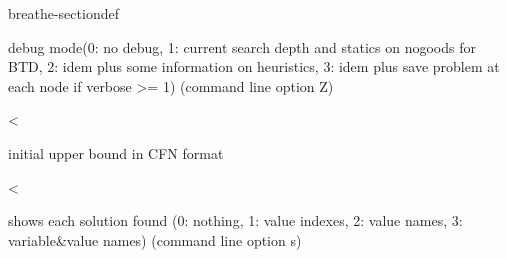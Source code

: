 \documentclass[letterpaper,10pt,openany,oneside,english]{sphinxmanual}
\begin{document}
\begin{fulllineitems}
\begin{sphinxuseclass}{breathe-sectiondef}
\begin{fulllineitems}
\sphinxAtStartPar
debug mode(0: no debug, 1: current search depth and statics on nogoods for BTD, 2: idem plus some information on heuristics, 3: idem plus save problem at each node if verbose \textgreater{}= 1) (command line option \sphinxhyphen{}Z) 

\end{fulllineitems}


\begin{fulllineitems}
\label{\detokenize{ref/ref_cpp:_CPPv4N8ToulBar213showSolutionsE}}\label{\detokenize{ref/ref_cpp:_CPPv3N8ToulBar213showSolutionsE}}\label{\detokenize{ref/ref_cpp:_CPPv2N8ToulBar213showSolutionsE}}\label{\detokenize{ref/ref_cpp:ToulBar2::showSolutions__i}}
\pysigstartsignatures
\pysigstartmultiline
{}
\pysigstopmultiline
\pysigstopsignatures
\sphinxAtStartPar
\textless{} 

\sphinxAtStartPar
initial upper bound in CFN format 

\end{fulllineitems}


\begin{fulllineitems}
\label{\detokenize{ref/ref_cpp:_CPPv4N8ToulBar210showHiddenE}}\label{\detokenize{ref/ref_cpp:_CPPv3N8ToulBar210showHiddenE}}\label{\detokenize{ref/ref_cpp:_CPPv2N8ToulBar210showHiddenE}}\label{\detokenize{ref/ref_cpp:ToulBar2::showHidden__b}}
\pysigstartsignatures
\pysigstartmultiline
{}
\pysigstopmultiline
\pysigstopsignatures
\sphinxAtStartPar
\textless{} 

\sphinxAtStartPar
shows each solution found (0: nothing, 1: value indexes, 2: value names, 3: variable\&value names) (command line option \sphinxhyphen{}s) 

\end{fulllineitems}


\end{sphinxuseclass}
\end{fulllineitems}
\end{document}
